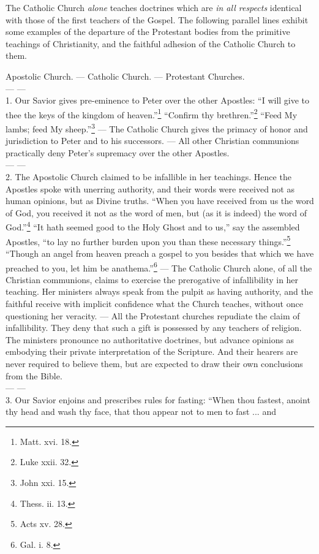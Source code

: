 The Catholic Church \emph{alone} teaches doctrines
which are \emph{in all respects} identical with those of
the first teachers of the Gospel. The following
parallel lines exhibit some examples of the departure
of the Protestant bodies from the primitive
teachings of Christianity, and the faithful adhesion
of the Catholic Church to them.

Apostolic Church. — Catholic Church. — Protestant Churches. \\
— — \\
1. Our Savior gives pre-eminence to Peter over the other Apostles:
“I will give to thee the keys of the kingdom of
heaven.”\footnote{Matt. xvi. 18.} “Confirm
thy brethren.”\footnote{Luke xxii. 32.} “Feed
My lambs; feed My sheep.”\footnote{John xxi. 15.} — The Catholic Church gives the primacy of honor and jurisdiction
to Peter and to his successors. — All other Christian communions practically deny Peter's supremacy
over the other Apostles. \\
— — \\
2. The Apostolic Church claimed to be infallible in her teachings. Hence the
Apostles spoke with unerring authority, and their words were received not as
human opinions, but as Divine truths. “When you have received from us the
word of God, you received it not as the word of men, but (as it is indeed) the
word of God.”\footnote{Thess. ii. 13.} “It hath seemed good
to the Holy Ghost and to us,” say the assembled Apostles, “to lay no further
burden upon you than these necessary things.”\footnote{Acts xv.
28.} “Though an angel from heaven preach a gospel to you besides that
which we have preached to you, let him be anathema.”\footnote{Gal.
i. 8.} — The Catholic Church alone, of all the Christian communions, claims to
exercise the prerogative of infallibility in her teaching. Her ministers always
speak from the pulpit as having authority, and the faithful receive with implicit
confidence what the Church teaches, without once questioning her veracity. — All the Protestant churches repudiate the claim of infallibility. They deny
that such a gift is possessed by any teachers of religion. The ministers pronounce
no authoritative doctrines, but advance opinions as embodying their private
interpretation of the Scripture. And their hearers are never required to believe
them, but are expected to draw their own conclusions from the Bible. \\
— — \\
3. Our Savior enjoins and prescribes rules for fasting: “When thou fastest,
anoint thy head and wash thy face, that thou appear not to men to fast ... and
